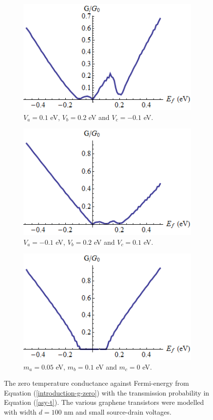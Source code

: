 		\begin{figure}[h]
			 \begin{subfigure}[h]{0.3\textwidth}
				\centerline{\includegraphics[scale=0.35]{images/asy-g-2}}
				\caption{$V_{a}=0.1$ eV, $V_{b}=0.2$ eV and $V_{c}=-0.1$ eV.}
			\end{subfigure}
			\hspace{0.5cm}
			\begin{subfigure}[h]{0.3\textwidth}
				\centerline{\includegraphics[scale=0.35]{images/asy-g-3}}
				\caption{$V_{a}=-0.1$ eV, $V_{b}=0.2$ eV and $V_{c}=0.1$ eV.}
			\end{subfigure}
			\hspace{0.5cm}
			\begin{subfigure}[h]{0.3\textwidth}
				\centerline{\includegraphics[scale=0.35]{images/asy-g-1}}
				\caption{$m_{a}=0.05$ eV, $m_{b}=0.1$ eV and $m_{c}=0$ eV.}
			\end{subfigure}
			\caption{The zero temperature conductance against Fermi-energy from Equation (\ref{introduction-g-zero}) with the transmission probability in Equation (\ref{asy-t}). The various graphene transistors were modelled with width $d=100$ nm and small source-drain voltages.}
			\label{asy-g-2}
		\end{figure}	
%